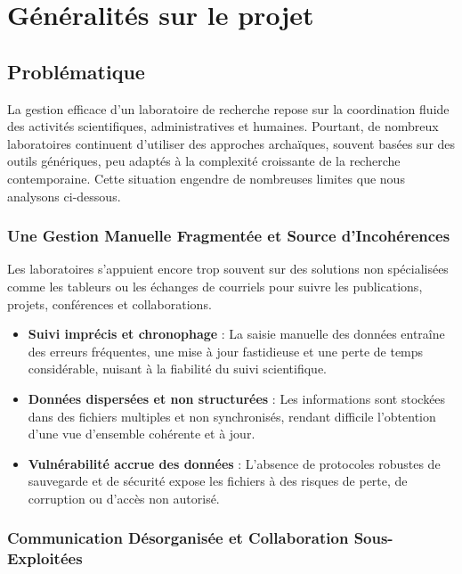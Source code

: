 \documentclass{rapportPfe}
\begin{document}

\chapter{Généralités sur le projet}

\section{Problématique}

La gestion efficace d’un laboratoire de recherche repose sur la coordination fluide des activités scientifiques, administratives et humaines. Pourtant, de nombreux laboratoires continuent d’utiliser des approches archaïques, souvent basées sur des outils génériques, peu adaptés à la complexité croissante de la recherche contemporaine. Cette situation engendre de nombreuses limites que nous analysons ci-dessous.

\subsection{Une Gestion Manuelle Fragmentée et Source d’Incohérences}

Les laboratoires s’appuient encore trop souvent sur des solutions non spécialisées comme les tableurs ou les échanges de courriels pour suivre les publications, projets, conférences et collaborations.

\begin{itemize}
  \item \textbf{Suivi imprécis et chronophage} : La saisie manuelle des données entraîne des erreurs fréquentes, une mise à jour fastidieuse et une perte de temps considérable, nuisant à la fiabilité du suivi scientifique.
  \item \textbf{Données dispersées et non structurées} : Les informations sont stockées dans des fichiers multiples et non synchronisés, rendant difficile l’obtention d’une vue d’ensemble cohérente et à jour.
  \item \textbf{Vulnérabilité accrue des données} : L’absence de protocoles robustes de sauvegarde et de sécurité expose les fichiers à des risques de perte, de corruption ou d’accès non autorisé.
\end{itemize}

\subsection{Communication Désorganisée et Collaboration Sous-Exploitées}
\end{document}
